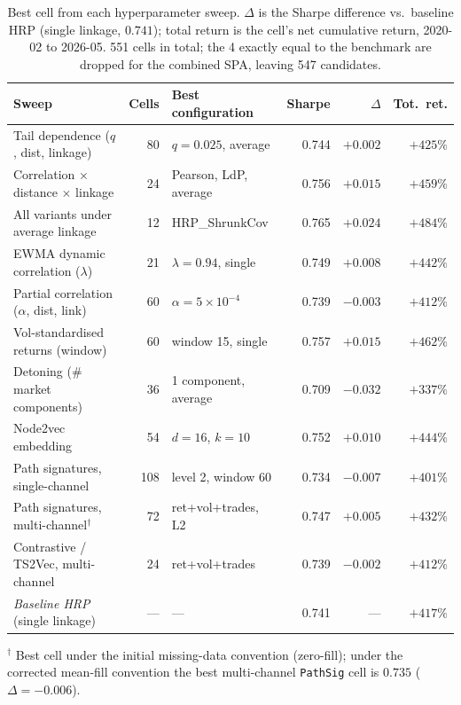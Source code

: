\documentclass[11pt,a4paper]{article}
\begin{document}
\begin{table}[H]
  \centering
  \small
  \caption{Best cell from each hyperparameter sweep. $\Delta$ is
  the Sharpe difference vs.\ baseline HRP (single linkage, $0.741$);
  total return is the cell's net cumulative return, 2020-02 to 2026-05.
  551 cells in total; the 4 exactly equal to the benchmark are dropped
  for the combined SPA, leaving 547 candidates.}
  \label{tab:sweeps}
  \begin{tabular}{lrlrrr}
    \toprule
    Sweep & Cells & Best configuration & Sharpe & $\Delta$ & Tot.\ ret. \\
    \midrule
    Tail dependence ($q$, dist, linkage)           & 80  & $q{=}0.025$, average        & 0.744 & $+0.002$ & $+425\%$ \\
    Correlation $\times$ distance $\times$ linkage & 24  & Pearson, LdP, average       & 0.756 & $+0.015$ & $+459\%$ \\
    All variants under average linkage             & 12  & HRP\_ShrunkCov              & 0.765 & $+0.024$ & $+484\%$ \\
    EWMA dynamic correlation ($\lambda$)           & 21  & $\lambda{=}0.94$, single    & 0.749 & $+0.008$ & $+442\%$ \\
    Partial correlation ($\alpha$, dist, link)     & 60  & $\alpha{=}5{\times}10^{-4}$ & 0.739 & $-0.003$ & $+412\%$ \\
    Vol-standardised returns (window)              & 60  & window 15, single           & 0.757 & $+0.015$ & $+462\%$ \\
    Detoning (\# market components)                & 36  & 1 component, average        & 0.709 & $-0.032$ & $+337\%$ \\
    Node2vec embedding                             & 54  & $d{=}16$, $k{=}10$          & 0.752 & $+0.010$ & $+444\%$ \\
    Path signatures, single-channel                & 108 & level 2, window 60          & 0.734 & $-0.007$ & $+401\%$ \\
    Path signatures, multi-channel$^{\dagger}$     & 72  & ret+vol+trades, L2          & 0.747 & $+0.005$ & $+432\%$ \\
    Contrastive / TS2Vec, multi-channel            & 24  & ret+vol+trades              & 0.739 & $-0.002$ & $+412\%$ \\
    \midrule
    \textit{Baseline HRP} (single linkage)         & ---  & ---                        & 0.741 & ---      & $+417\%$ \\
    \bottomrule
  \end{tabular}

  \vspace{2pt}
  {\footnotesize $^{\dagger}$ Best cell under the initial missing-data
  convention (zero-fill); under the corrected mean-fill convention the
  best multi-channel \texttt{PathSig} cell is $0.735$ ($\Delta=-0.006$).}
\end{table}
\end{document}
